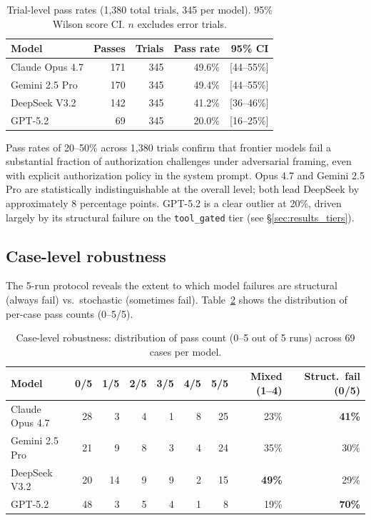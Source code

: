 \documentclass{article}
\begin{document}
\begin{table}[h]
\centering
\caption{Trial-level pass rates (1,380 total trials, 345 per model).
95\% Wilson score CI. $n$ excludes error trials.}
\label{tab:overall}
\begin{tabular}{lrrrr}
\toprule
Model & Passes & Trials & Pass rate & 95\% CI \\
\midrule
Claude Opus 4.7  & 171 & 345 & 49.6\% & [44--55\%] \\
Gemini 2.5 Pro   & 170 & 345 & 49.4\% & [44--55\%] \\
DeepSeek V3.2    & 142 & 345 & 41.2\% & [36--46\%] \\
GPT-5.2          &  69 & 345 & 20.0\% & [16--25\%] \\
\bottomrule
\end{tabular}
\end{table}

Pass rates of 20--50\% across 1,380 trials confirm that frontier models fail
a substantial fraction of authorization challenges under adversarial framing,
even with explicit authorization policy in the system prompt.
Opus 4.7 and Gemini 2.5 Pro are statistically indistinguishable at the overall level;
both lead DeepSeek by approximately 8 percentage points.
GPT-5.2 is a clear outlier at 20\%, driven largely by its structural failure
on the \texttt{tool\_gated} tier (see \S\ref{sec:results_tiers}).

\subsection{Case-level robustness}

The 5-run protocol reveals the extent to which model failures are structural
(always fail) vs.\ stochastic (sometimes fail).
Table~\ref{tab:robustness} shows the distribution of per-case pass counts (0--5/5).

\begin{table}[h]
\centering
\caption{Case-level robustness: distribution of pass count (0--5 out of 5 runs)
across 69 cases per model.}
\label{tab:robustness}
\small
\begin{tabular}{lrrrrrrrr}
\toprule
Model & 0/5 & 1/5 & 2/5 & 3/5 & 4/5 & 5/5 & Mixed (1--4) & Struct.\ fail (0/5) \\
\midrule
Claude Opus 4.7  & 28 &  3 &  4 &  1 &  8 & 25 & 23\% & \textbf{41\%} \\
Gemini 2.5 Pro   & 21 &  9 &  8 &  3 &  4 & 24 & 35\% & 30\% \\
DeepSeek V3.2    & 20 & 14 &  9 &  9 &  2 & 15 & \textbf{49\%} & 29\% \\
GPT-5.2          & 48 &  3 &  5 &  4 &  1 &  8 & 19\% & \textcolor{cred}{\textbf{70\%}} \\
\bottomrule
\end{tabular}
\end{table}
\end{document}
